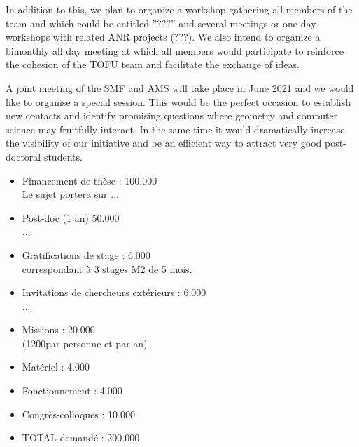 \documentclass[14pt,fleqn]{article}
\begin{document}
In addition to this, we plan to organize a workshop gathering all members of the
team and which could be entitled ”???” and several meetings
or one-day workshops with related ANR projects (???).
We also intend to organize 
a bimonthly all day meeting 
at which all members would participate
to reinforce the cohesion of the TOFU team
and facilitate the exchange of ideas.

A joint meeting of the SMF and AMS
will take place in June 2021
and we would like to organise a
special session.
This would be the perfect occasion to establish new contacts and identify promising questions where
geometry and computer science may fruitfully interact. In the same time it would dramatically
increase the visibility of our initiative and be an efficient way to attract very good post-doctoral
students.

\vspace{.5in}
 
\begin{itemize}

\item Financement de thèse : \hfill 100.000 \EUR\\
{\footnotesize Le sujet portera sur ...}
\item Post-doc (1 an) \hfill 50.000 \EUR\\
{\footnotesize ...}
\item Gratifications de stage : \hfill 6.000 \EUR\\
{\footnotesize correspondant à 3 stages M2 de 5 mois.}
\item Invitations de chercheurs extérieurs : \hfill 6.000 \EUR\\
{\footnotesize ...
}
\item Missions : \hfill 20.000 \EUR\\
{\footnotesize (1200\EUR par personne et par an)}
\item Matériel : \hfill 4.000 \EUR
\item Fonctionnement : \hfill 4.000 \EUR
\item Congrès-colloques :  \hfill 10.000 \EUR
\item TOTAL demandé : \hfill 200.000 \EUR
\end{itemize}


  

  
\end{document}
